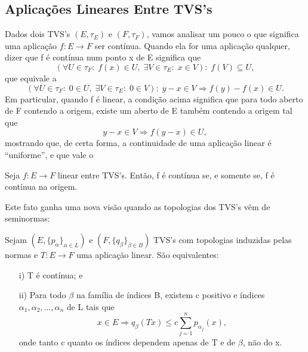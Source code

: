\documentclass[../distribution_theory_notes.tex]{subfiles}
\begin{document}
\subsection{Aplicações Lineares Entre TVS's}
Dados dois TVS's \((E, \tau_{E})\) e \((F, \tau_{F})\), vamos analisar um pouco o que significa uma aplicação \(f:E\rightarrow F\) ser contínua. Quando ela for uma aplicação qualquer, dizer que f é contínua num ponto x de E significa que
\[
	(\forall U\in \tau_{F}:\; f(x)\in U,\; \exists V\in \tau_{E}:\; x\in V):\; f(V)\subseteq U,
\]
que equivale a
\[
	(\forall U\in \tau_{F}:\;0\in U,\; \exists V\in \tau_{E}:\;0\in V):\; y-x\in V \Rightarrow f(y)-f(x)\in U.
\]
Em particular, quando f é linear, a condição acima significa que para todo aberto de F contendo a origem, existe um aberto de E também contendo a origem tal que
\[
	y-x\in V \Rightarrow f(y-x)\in U,
\]
mostrando que, de certa forma, a continuidade de uma aplicação linear é ``uniforme'', e que vale o
\begin{theorem*}
	Seja \(f:E\rightarrow F\) linear entre TVS's. Então, f é contínua se, e somente se, f é contínua na origem.
\end{theorem*}
Este fato ganha uma nova visão quando as topologias dos TVS's vêm de seminormas:
\begin{prop*}
	Sejam \((E, \{p_{\alpha }\}_{\alpha \in L})\) e \((F, \{q_{\beta }\}_{\beta \in B})\) TVS's com topologias induzidas pelas normas e \(T:E\rightarrow F\) uma aplicação linear. São equivalentes:
	\begin{itemize}
		\item[i)] T é contínua; e
		\item[ii)] Para todo \(\beta \) na família de índices B, existem c positivo e índices \(\alpha_1, \alpha_2,\dotsc , \alpha_{n}\) de L tais que
		      \[
			      x\in E \Rightarrow q_{\beta }(Tx)\leq c \sum\limits_{j=1}^{n}p_{\alpha_{j}}(x),
		      \]
		      onde tanto c quanto os índices dependem apenas de T e de \(\beta\), não do x.
	\end{itemize}
\end{prop*}
\end{document}
